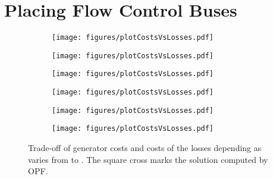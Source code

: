 \documentclass{article}[11pt,a4paper]
\begin{document}
\section{Placing Flow Control Buses} \label{app:hybridmodel}
\begin{figure}[H]\begin{subfigure}[t]{.45\textwidth}
  	\centering
    	\texttt{[image: figures/plotCostsVsLosses.pdf]}
	\label{fig:plot-costs-losses-case6}  
  \end{subfigure}
\hfill
  \begin{subfigure}[t]{.45\textwidth}
  	\centering
    	\texttt{[image: figures/plotCostsVsLosses.pdf]}
	\label{fig:plot-costs-losses-case9}
\end{subfigure}

\vspace{0.3cm}
\begin{subfigure}[t]{.45\textwidth}
  	\centering
    	\texttt{[image: figures/plotCostsVsLosses.pdf]}
\end{subfigure}
\hfill
\begin{subfigure}[t]{.45\textwidth}
  	\centering
    	\texttt{[image: figures/plotCostsVsLosses.pdf]}
	\label{fig:plot-costs-losses-case39}
\end{subfigure}

\vspace{0.3cm}
\begin{subfigure}[t]{.45\textwidth}
  	\centering
    	\texttt{[image: figures/plotCostsVsLosses.pdf]}
	\label{fig:plot-costs-losses-case57}
\end{subfigure}
\hfill
\begin{subfigure}[b]{.45\textwidth}
  	\centering
    	\texttt{[image: figures/plotCostsVsLosses.pdf]}
	\label{fig:plot-costs-losses-case118}
\end{subfigure}
\vspace{0cm}
\caption{Trade-off of generator costs and costs of the losses
          depending as  varies from  to .   The square cross marks the solution computed by OPF.}
\end{figure}
\end{document}
